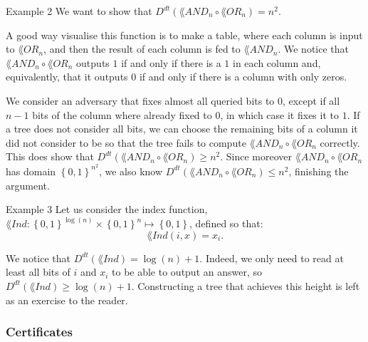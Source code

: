 \documentclass[a4paper]{article}
\begin{document}
\begin{parag}{Example 2}
    We want to show that $D^{dt}\left(\lang{AND}_n \circ \lang{OR}_n\right) = n^2$. 

    A good way visualise this function is to make a table, where each column is input to $\lang{OR}_n$, and then the result of each column is fed to $\lang{AND}_n$. We notice that $\lang{AND}_n \circ \lang{OR}_n$ outputs $1$ if and only if there is a $1$ in each column and, equivalently, that it outputs $0$ if and only if there is a column with only zeros.

   We consider an adversary that fixes almost all queried bits to $0$, except if all $n-1$ bits of the column where already fixed to $0$, in which case it fixes it to $1$. If a tree does not consider all bits, we can choose the remaining bits of a column it did not consider to be so that the tree fails to compute $\lang{AND}_n \circ \lang{OR}_n$ correctly. This does show that $D^{dt}\left(\lang{AND}_n \circ \lang{OR}_n\right) \geq n^2$. Since moreover $\lang{AND}_n \circ \lang{OR}_n$ has domain $\left\{0, 1\right\}^{n^2}$, we also know $D^{dt}\left(\lang{AND}_n \circ \lang{OR}_n\right) \leq n^2$, finishing the argument.
\end{parag}

\begin{parag}{Example 3}
    Let us consider the index function, $\lang{Ind}: \left\{0, 1\right\}^{\log\left(n\right)} \times \left\{0, 1\right\}^n \mapsto \left\{0, 1\right\}$, defined so that: 
    \[\lang{Ind}\left(i, x\right) = x_i.\]
    
    We notice that $D^{dt}\left(\lang{Ind}\right) = \log\left(n\right) + 1$. Indeed, we only need to read at least all bits of $i$ and $x_i$ to be able to output an answer, so $D^{dt}\left(\lang{Ind}\right) \geq \log\left(n\right) + 1$. Constructing a tree that achieves this height is left as an exercise to the reader.
\end{parag}

\subsubsection{Certificates}
\end{document}
